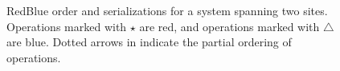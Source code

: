 \documentclass[11pt]{article}
\begin{document}
\begin{figure}[t!]
\centering
 \begin{minipage}[t]{0.45\columnwidth}
\centering
{}
\end{minipage}
 \begin{minipage}[t]{0.45\columnwidth}
\centering
{}
\end{minipage}
\caption{RedBlue order and serializations for a system spanning two
  sites. Operations marked with {\Large $\star$} are red, and
  operations marked with $\bigtriangleup$ are blue. Dotted arrows in \protect{} indicate the partial ordering of
operations. }
\label{fig:expositoryfigure}
\end{figure}
\end{document}
